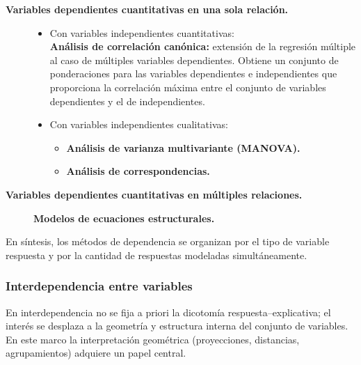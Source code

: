 \documentclass[12pt, a4paper]{article}
\theoremstyle{plain}
\theoremstyle{definition}
\theoremstyle{remark}
\begin{document}
\begin{description}
  \item[\textbf{Variables dependientes cuantitativas en una sola relación.}]
    \begin{itemize}
      \item Con variables independientes cuantitativas:\\
            \textbf{Análisis de correlación canónica:} extensión de la regresión
            múltiple al caso de múltiples variables dependientes. Obtiene un
            conjunto de ponderaciones para las variables dependientes e
            independientes que proporciona la correlación máxima entre el
            conjunto de variables dependientes y el de independientes.
      \item Con variables independientes cualitativas:
            \begin{itemize}
              \item \textbf{Análisis de varianza multivariante (MANOVA).}
              \item \textbf{Análisis de correspondencias.}
            \end{itemize}
    \end{itemize}
  \item[\textbf{Variables dependientes cuantitativas en múltiples relaciones.}]
        \textbf{Modelos de ecuaciones estructurales.}
\end{description}

En síntesis, los métodos de dependencia se organizan por el tipo de variable
respuesta y por la cantidad de respuestas modeladas simultáneamente.

\subsubsection{Interdependencia entre variables}

En interdependencia no se fija a priori la dicotomía respuesta--explicativa; el
interés se desplaza a la geometría y estructura interna del conjunto de
variables. En este marco la interpretación geométrica (proyecciones,
distancias, agrupamientos) adquiere un papel central.
\end{document}
